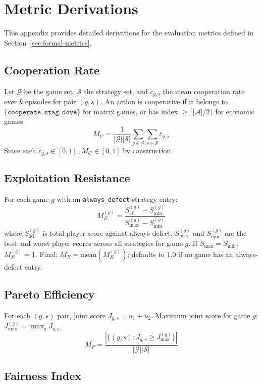 
\section{Metric Derivations}
\label{app:metrics}

This appendix provides detailed derivations for the evaluation metrics
defined in Section~\ref{sec:formal-metrics}.

\subsection{Cooperation Rate}

Let $\mathcal{G}$ be the game set, $\mathcal{S}$ the strategy set, and
$\bar{c}_{g,s}$ the mean cooperation rate over $k$ episodes for pair $(g,s)$.
An action is cooperative if it belongs to
$\{\texttt{cooperate}, \texttt{stag}, \texttt{dove}\}$ for matrix games,
or has index $\geq \lceil |\mathcal{A}|/2 \rceil$ for economic games.
\[
M_C = \frac{1}{|\mathcal{G}||\mathcal{S}|} \sum_{g \in \mathcal{G}}
  \sum_{s \in \mathcal{S}} \bar{c}_{g,s}
\]
Since each $\bar{c}_{g,s} \in [0,1]$, $M_C \in [0,1]$ by construction.

\subsection{Exploitation Resistance}

For each game $g$ with an \texttt{always\_defect} strategy entry:
\[
M_E^{(g)} = \frac{S_{\text{ad}}^{(g)} - S_{\min}^{(g)}}
  {S_{\max}^{(g)} - S_{\min}^{(g)}}
\]
where $S_{\text{ad}}^{(g)}$ is total player score against always-defect,
$S_{\max}^{(g)}$ and $S_{\min}^{(g)}$ are the best and worst player scores
across all strategies for game $g$. If $S_{\max} = S_{\min}$, $M_E^{(g)} = 1$.
Final: $M_E = \text{mean}(M_E^{(g)})$; defaults to $1.0$ if no game has
an always-defect entry.

\subsection{Pareto Efficiency}

For each $(g,s)$ pair, joint score $J_{g,s} = u_1 + u_2$. Maximum joint
score for game $g$: $J_{\max}^{(g)} = \max_s J_{g,s}$.
\[
M_P = \frac{|\{(g,s) : J_{g,s} \geq J_{\max}^{(g)}\}|}{|\mathcal{G}||\mathcal{S}|}
\]

\subsection{Fairness Index}

